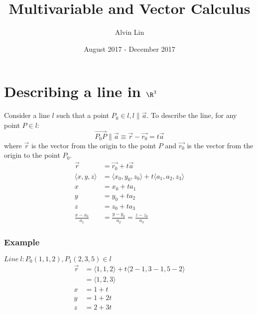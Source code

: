 \documentclass{math}
\title{Multivariable and Vector Calculus}
\author{Alvin Lin}
\date{August 2017 - December 2017}
\begin{document}
\maketitle

\section*{Describing a line in \( \R^3 \)}
Consider a line \( l \) such that a point \( P_0\in l, l\parallel\vec{a} \).
To describe the line, for any point \( P\in l \):
\[ \overrightarrow{P_{0}P}\parallel\vec{a} \equiv \vec{r}-\vec{r_0}=t\vec{a} \]
where \( \vec{r} \) is the vector from the origin to the point \( P \) and
\( \vec{r_0} \) is the vector from the origin to the point \( P_0 \).
\begin{align*}
  \vec{r} &= \vec{r_0}+t\vec{a} \\
  \langle x,y,z\rangle &= \langle x_0,y_0,z_0\rangle+
    t\langle a_1,a_2,z_3\rangle \\
  x &= x_0+ta_1 \\
  y &= y_0+ta_2 \\
  z &= z_0+ta_3 \\
  \frac{x-x_0}{a_1} &= \frac{y-y_0}{a_2} = \frac{z-z_0}{a_3}
\end{align*}

\subsubsection*{Example}
\( Line\ l: P_0(1,1,2), P_1(2,3,5)\in l \)
\begin{align*}
  \vec{r} &= \langle1,1,2\rangle+t\langle2-1,3-1,5-2\rangle \\
  &= \langle1,2,3\rangle \\
  x &= 1+t \\
  y &= 1+2t \\
  z &= 2+3t
\end{align*}
\end{document}
